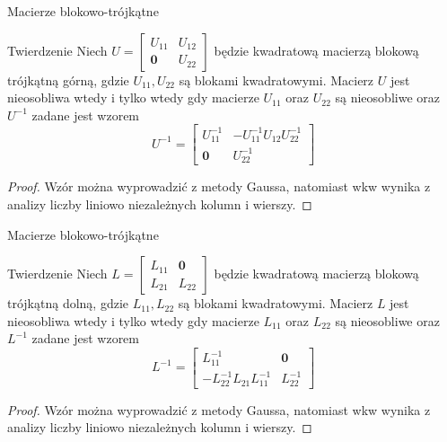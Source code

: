 \documentclass{beamer}
\newcommand{\zero}{\mathbf{0}}
\begin{document}
\begin{frame}{Macierze blokowo-trójkątne}
    \begin{block}{Twierdzenie}
        Niech $U = \begin{bmatrix}
            U_{11} & U_{12} \\ \zero & U_{22}
        \end{bmatrix}$
        będzie kwadratową macierzą blokową trójkątną górną, gdzie $U_{11}, U_{22}$ są blokami kwadratowymi. Macierz $U$ jest nieosobliwa wtedy i tylko wtedy 
        gdy macierze $U_{11}$ oraz  $U_{22}$ są nieosobliwe oraz $U^{-1}$ zadane jest wzorem
        $$ U^{-1} = \begin{bmatrix}
            U_{11}^{-1} & -U_{11}^{-1} U_{12} U _{22}^{-1} \\ \zero & U_{22}^{-1}
        \end{bmatrix}$$
    \end{block}
    \pause 
    \begin{proof}
        Wzór można wyprowadzić z metody Gaussa, 
        natomiast wkw wynika z analizy liczby liniowo niezależnych kolumn i wierszy.
    \end{proof}
\end{frame}

\begin{frame}{Macierze blokowo-trójkątne}
    \begin{block}{Twierdzenie}
        Niech $L = \begin{bmatrix}
            L_{11} & \zero \\ L_{21} & L_{22}
        \end{bmatrix}$
        będzie kwadratową macierzą blokową trójkątną dolną, gdzie $L_{11}, L_{22}$ są blokami kwadratowymi. Macierz $L$ jest nieosobliwa wtedy i tylko wtedy 
        gdy macierze $L_{11}$ oraz  $L_{22}$ są nieosobliwe oraz $L^{-1}$ zadane jest wzorem
        $$ L^{-1} = \begin{bmatrix}
            L_{11}^{-1} & \zero\\ -L_{22}^{-1} L_{21} L _{11}^{-1}  & L_{22}^{-1}
        \end{bmatrix}$$
    \end{block}
    \pause 
    \begin{proof}
        Wzór można wyprowadzić z metody Gaussa, 
        natomiast wkw wynika z analizy liczby liniowo niezależnych kolumn i wierszy.
    \end{proof}
\end{frame}
\end{document}
